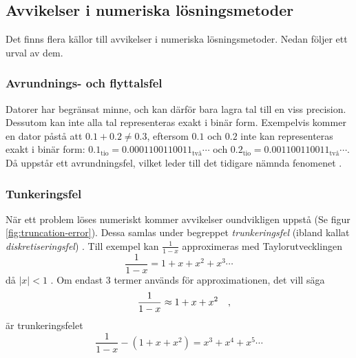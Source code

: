 \subsection{Avvikelser i numeriska lösningsmetoder}\label{sec:error_analysis}
Det finns flera källor till avvikelser i numeriska lösningsmetoder. Nedan följer ett urval av dem.

\subsubsection{Avrundnings- och flyttalsfel}
Datorer har begränsat minne, och kan därför bara lagra tal till en viss precision. Dessutom kan inte alla tal representeras exakt i binär form. Exempelvis kommer en dator påstå att \(0.1+0.2\neq0.3\), eftersom \(0.1\) och \(0.2\) inte kan representeras exakt i binär form: \(0.1_\text{tio}=0.0001100110011_\text{två}\cdots\) och \(0.2_\text{tio}=0.001100110011_\text{två}\cdots\). Då uppstår ett avrundningsfel, vilket leder till det tidigare nämnda fenomenet \parencite[20]{atkinson_introduction_1989}.

\subsubsection{Tunkeringsfel}
När ett problem löses numeriskt kommer avvikelser oundvikligen uppstå (Se figur \ref{fig:truncation-error}). Dessa samlas under begreppet \emph{trunkeringsfel} (ibland kallat \emph{diskretiseringsfel}) \parencite[20; 342]{atkinson_introduction_1989}. Till exempel kan \(\frac{1}{1-x}\) approximeras med Taylorutvecklingen
\begin{equation*}
    \frac{1}{1-x}=1+x+x^2+x^3\cdots
\end{equation*} då \(|x|<1\) \parencite{math_is_fun_taylor_nodate}. Om endast 3 termer används för approximationen, det vill säga
\begin{equation*}
    \frac{1}{1-x}\approx1+x+x^2
\quad\mathrm{,}\!\!\!\!\!\!\end{equation*} är trunkeringsfelet
\begin{equation*}
    \frac{1}{1-x}-(1+x+x^2)=x^3+x^4+x^5\cdots
\end{equation*}

